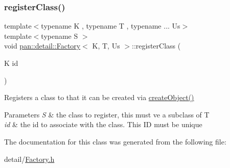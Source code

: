 \subsubsection{\texorpdfstring{register\+Class()}{registerClass()}}
{\footnotesize\ttfamily template$<$typename K , typename T , typename ... Us$>$ \\
template$<$typename S $>$ \\
void \hyperlink{classpan_1_1detail_1_1_factory}{pan\+::detail\+::\+Factory}$<$ K, T, Us $>$\+::register\+Class (\begin{DoxyParamCaption}\item[{K}]{id }\end{DoxyParamCaption})\hspace{0.3cm}{\ttfamily [inline]}}

Registers a class to that it can be created via \hyperlink{classpan_1_1detail_1_1_factory_a30fe3b9f6541e9f611edb51bd54584e5}{create\+Object()}


\begin{DoxyParams}{Parameters}
{\em S} & the class to register, this must ve a subclass of T \\
\hline
{\em id} & the id to associate with the class. This ID must be unique \\
\hline
\end{DoxyParams}


The documentation for this class was generated from the following file\+:\begin{DoxyCompactItemize}
\item 
detail/\hyperlink{_factory_8h}{Factory.\+h}\end{DoxyCompactItemize}
